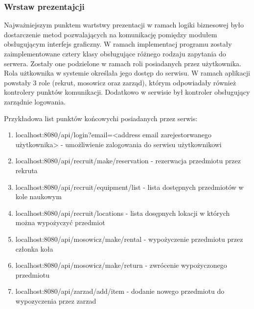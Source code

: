 \documentclass{article}
\begin{document}
\subsubsection{Wrstaw prezentajcji}

Najważniejszym punktem wartstwy prezentacji w ramach logiki biznesowej było dostarczenie metod pozwalających na komunikację pomiędzy modułem obsługującym interfejs graficzny. W ramach implementacj 
programu zostały zaimplementowane cztery klasy obsługujące różnego rodzaju zapytania do serwera. Zostały one podzielone w ramach roli posiadanych przez użytkownika. Rola użtkownika w 
systemie określała jego dostęp do serwisu. W ramach aplikacji powstały 3 role (rekrut, mosowicz oraz zarząd), którym odpowiadały również kontrolery punktów komunikacji. Dodatkowo w serwisie był
kontroler obsługujący zarządnie logowania.

Przykładowa list punktów końcowychi posiadanych przez serwis:  

\begin{center}
    \begin{enumerate}
        \item localhost:8080/api/login?email=<address email zarejestorwanego użytkownika> - umożliwienie zalogowania do serwisu użytkownikowi \\
        \item localhost:8080/api/recruit/make/reservation - rezerwacja przedmiotu przez rekruta \\
        \item localhost:8080/api/recruit/equipment/list - lista dostępnych przedmiotów w kole naukowym \\
        \item localhost:8080/api/recruit/locations - lista dosępnych  lokacji w których można wypożyczyć przedmiot \\
        \item localhost:8080/api/mosowicz/make/rental - wypożyczenie przedmiotu przez członka koła \\
        \item localhost:8080/api/mosowicz/make/return - zwrócenie wypożyczonego przedmiotu \\ 
        \item localhost:8080/api/zarzad/add/item - dodanie nowego przedmiotu do wypozyczenia przez zarzad \\
    \end{enumerate}
\end{center}
\end{document}
